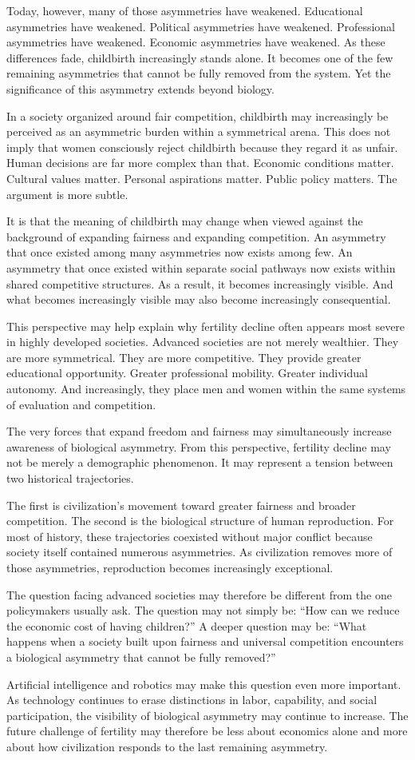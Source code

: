 \documentclass[12pt]{article}
\begin{document}
Today, however, many of those asymmetries have weakened. Educational asymmetries have weakened. Political asymmetries have weakened. Professional asymmetries have weakened. Economic asymmetries have weakened. As these differences fade, childbirth increasingly stands alone. It becomes one of the few remaining asymmetries that cannot be fully removed from the system. Yet the significance of this asymmetry extends beyond biology.

In a society organized around fair competition, childbirth may increasingly be perceived as an asymmetric burden within a symmetrical arena. This does not imply that women consciously reject childbirth because they regard it as unfair. Human decisions are far more complex than that. Economic conditions matter. Cultural values matter. Personal aspirations matter. Public policy matters. The argument is more subtle.

It is that the meaning of childbirth may change when viewed against the background of expanding fairness and expanding competition. An asymmetry that once existed among many asymmetries now exists among few. An asymmetry that once existed within separate social pathways now exists within shared competitive structures. As a result, it becomes increasingly visible. And what becomes increasingly visible may also become increasingly consequential.

This perspective may help explain why fertility decline often appears most severe in highly developed societies. Advanced societies are not merely wealthier. They are more symmetrical. They are more competitive. They provide greater educational opportunity. Greater professional mobility. Greater individual autonomy. And increasingly, they place men and women within the same systems of evaluation and competition.

The very forces that expand freedom and fairness may simultaneously increase awareness of biological asymmetry. From this perspective, fertility decline may not be merely a demographic phenomenon. It may represent a tension between two historical trajectories. 

The first is civilization’s movement toward greater fairness and broader competition. The second is the biological structure of human reproduction. For most of history, these trajectories coexisted without major conflict because society itself contained numerous asymmetries. As civilization removes more of those asymmetries, reproduction becomes increasingly exceptional.

The question facing advanced societies may therefore be different from the one policymakers usually ask. The question may not simply be: “How can we reduce the economic cost of having children?” A deeper question may be: “What happens when a society built upon fairness and universal competition encounters a biological asymmetry that cannot be fully removed?”

Artificial intelligence and robotics may make this question even more important. As technology continues to erase distinctions in labor, capability, and social participation, the visibility of biological asymmetry may continue to increase. The future challenge of fertility may therefore be less about economics alone and more about how civilization responds to the last remaining asymmetry.
\end{document}
